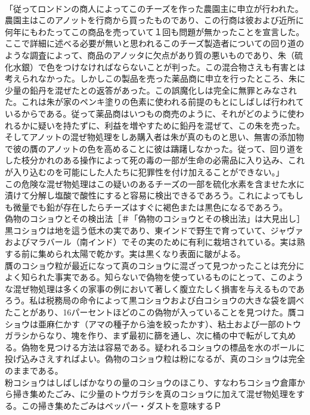 \documentclass[8pt]{extreport}
\begin{document}
\begin{CJK}{UTF8}{min}
\\	「従ってロンドンの商人によってこのチーズを作った農園主に申立が行われた。農園主はこのアノットを行商から買ったものであり、この行商は彼および近所に何年にもわたってこの商品を売っていて１回も問題が無かったことを宣言した。ここで詳細に述べる必要が無いと思われるこのチーズ製造者についての回り道のような調査によって、商品のアノッタに欠点があり質の悪いものであり、朱（硫化水銀）で色をつけなければならないことが判った。この混合物さえも有害とは考えられなかった。しかしこの製品を売った薬品商に申立を行ったところ、朱に少量の鉛丹を混ぜたとの返答があった。この誤魔化しは完全に無罪とみなされた。これは朱が家のペンキ塗りの色素に使われる前提のもとにしばしば行われているからである。従って薬品商はいつもの商売のように、それがどのように使われるかに疑いを持たずに、利益を増やすために鉛丹を混ぜて、この朱を売った。そしてアノットの混ぜ物処理をしあ購入者は朱が真のものと思い、無害の添加物で彼の贋のアノットの色を高めることに彼は躊躇しなかった。従って、回り道をした枝分かれのある操作によって死の毒の一部が生命の必需品に入り込み、これが入り込むのを可能にした人たちに犯罪性を付け加えることができない。」
\\	この危険な混ぜ物処理はこの疑いのあるチーズの一部を硫化水素を含ませた水に漬けて分解し塩酸で酸性にすると容易に検出できるであろう。これによってもしも微量でも鉛が存在したらチーズはすぐに褐色または黒色になるであろう。
\\	偽物のコショウとその検出法［＃「偽物のコショウとその検出法」は大見出し］
\\	黒コショウは地を這う低木の実であり、東インドで野生で育っていて、ジャヴァおよびマラバール（南インド）でその実のために有利に栽培されている。実は熟する前に集められ太陽で乾かす。実は黒くなり表面に皺がよる。
\\	贋のコショウ粒が最近になって真のコショウに混ざって見つかったことは充分によく知られた事実である。知らないで偽物を使っているものにとって、このような混ぜ物処理は多くの家事の例において著しく腹立たしく損害を与えるものであろう。私は税務局の命令によって黒コショウおよび白コショウの大きな袋を調べたことがあり、16パーセントほどのこの偽物が入っていることを見つけた。贋コショウは亜麻仁かす（アマの種子から油を絞ったかす）、粘土および一部のトウガラシからなり、塊を作り、まず最初に篩を通し、次に桶の中で転がして丸める。偽物を見つける方法は容易である。疑われるコショウの標品を水のボールに投げ込みさえすればよい。偽物のコショウ粒は粉になるが、真のコショウは完全のままである。
\\	粉コショウはしばしばかなりの量のコショウのほこり、すなわちコショウ倉庫から掃き集めたごみ、に少量のトウガラシを真のコショウに加えて混ぜ物処理をする。この掃き集めたごみはペッパー・ダストを意味するＰ

\end{CJK}
\end{document}
